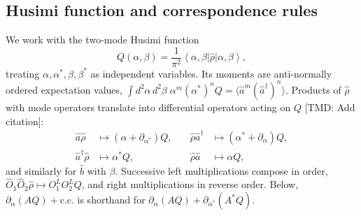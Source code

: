 \documentclass[aps,prx,reprint,floatfix,amsmath,amssymb,longbibliography]{revtex4-2}
\newcommand{\ket}[1]{\left|#1\right\rangle}
\newcommand{\bra}[1]{\left\langle#1\right|}
\newcommand{\da}{^\dagger}
\newcommand{\ha}{\hat{a}}
\newcommand{\hb}{\hat{b}}
\newcommand{\TMD}[1]{{\color{Blue} [TMD: {#1}]}}
\begin{document}
\subsection{Husimi function and correspondence rules}
We work with the two-mode Husimi function
\begin{equation}
    Q(\alpha,\beta)=\frac{1}{\pi^2}\bra{\alpha,\beta}\hat\rho\ket{\alpha,\beta},
\end{equation}
treating $\alpha,\alpha^*,\beta,\beta^*$ as independent variables. Its moments are anti-normally ordered expectation values, $\int d^2\alpha\,d^2\beta\;\alpha^m(\alpha^*)^n Q=\langle\ha^m(\ha\da)^n\rangle$. Products of $\hat\rho$ with mode operators translate into differential operators acting on $Q$ \TMD{Add citation}:
\begin{equation}
\begin{aligned}
    \ha\hat\rho &\mapsto (\alpha+\partial_{\alpha^*})Q, &\quad \hat\rho\ha\da &\mapsto (\alpha^*+\partial_\alpha)Q,\\
    \ha\da\hat\rho &\mapsto \alpha^*Q, &\quad \hat\rho\ha &\mapsto \alpha Q,
\end{aligned}
\label{eq_app_rules}
\end{equation}
and similarly for $\hb$ with $\beta$. Successive left multiplications compose in order, $\hat O_1\hat O_2\hat\rho\mapsto O_1^{L}O_2^{L}Q$, and right multiplications in reverse order. Below, $\partial_\alpha(AQ)+\text{c.c.}$ is shorthand for $\partial_\alpha(AQ)+\partial_{\alpha^*}(A^*Q)$.
\end{document}
